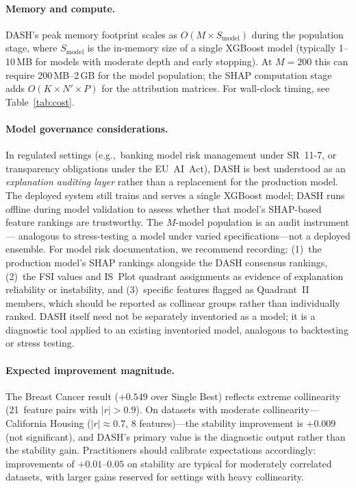 \documentclass[11pt]{article}
\newcommand{\dash}{\textsc{DASH}}
\newcommand{\eg}{e.g.,\ }
\begin{document}
\paragraph{Memory and compute.}
\dash{}'s peak memory footprint scales as $O(M \times S_{\text{model}})$
during the population stage, where $S_{\text{model}}$ is the in-memory
size of a single XGBoost model (typically 1--10\,MB for models with
moderate depth and early stopping).  At $M = 200$ this can require
200\,MB--2\,GB for the model population; the SHAP computation stage
adds $O(K \times N' \times P)$ for the attribution matrices.  For
wall-clock timing, see Table~\ref{tab:cost}.

\paragraph{Model governance considerations.}
In regulated settings (\eg banking model risk management under SR~11-7,
or transparency obligations under the EU~AI~Act), \dash{} is best
understood as an \emph{explanation auditing layer} rather than a
replacement for the production model. The deployed system still trains
and serves a single XGBoost model; \dash{} runs offline during model
validation to assess whether that model's SHAP-based feature rankings
are trustworthy. The $M$-model population is an audit instrument---
analogous to stress-testing a model under varied specifications---not a
deployed ensemble. For model risk documentation, we recommend recording:
(1)~the production model's SHAP rankings alongside the \dash{} consensus
rankings, (2)~the FSI values and IS~Plot quadrant assignments as evidence
of explanation reliability or instability, and (3)~specific features
flagged as Quadrant~II members, which should be reported as collinear
groups rather than individually ranked.
\dash{} itself need not be separately inventoried as a model; it is a
diagnostic tool applied to an existing inventoried model, analogous to
backtesting or stress testing.

\paragraph{Expected improvement magnitude.}
The Breast Cancer result ($+0.549$ over Single Best) reflects extreme
collinearity (21~feature pairs with $|r| > 0.9$). On datasets with
moderate collinearity---California Housing ($|r| \approx 0.7$, 8
features)---the stability improvement is $+0.009$ (not significant),
and \dash{}'s primary value is the diagnostic output rather than the
stability gain. Practitioners should calibrate expectations
accordingly: improvements of $+0.01$--$0.05$ on stability are typical
for moderately correlated datasets, with larger gains reserved for
settings with heavy collinearity.
\end{document}
